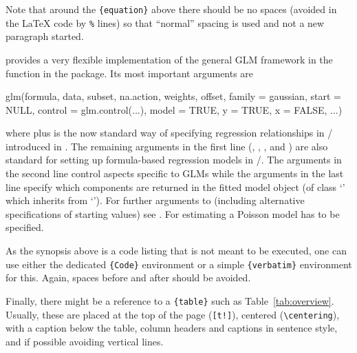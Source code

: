 \documentclass[article]{jss}
\newcommand{\class}[1]{`\code{#1}'}
\newcommand{\fct}[1]{\code{#1()}}
\begin{document}
\begin{leftbar}
Note that around the \verb|{equation}| above there should be no spaces (avoided
in the {\LaTeX} code by \verb|%| lines) so that ``normal'' spacing is used and
not a new paragraph started.
\end{leftbar}

 provides a very flexible implementation of the general GLM
framework in the function \fct{glm} \citep{Chambers+Hastie:1992} in the
 package. Its most important arguments are
\begin{Code}
glm(formula, data, subset, na.action, weights, offset,
  family = gaussian, start = NULL, control = glm.control(...),
  model = TRUE, y = TRUE, x = FALSE, ...)
\end{Code}
where  plus  is the now standard way of specifying
regression relationships in / introduced in
\cite{Chambers+Hastie:1992}. The remaining arguments in the first line
(, , , and ) are also
standard  for setting up formula-based regression models in
/. The arguments in the second line control aspects
specific to GLMs while the arguments in the last line specify which components
are returned in the fitted model object (of class \class{glm} which inherits
from \class{lm}). For further arguments to \fct{glm} (including alternative
specifications of starting values) see . For estimating a Poisson
model  has to be specified.

\begin{leftbar}
As the synopsis above is a code listing that is not meant to be executed,
one can use either the dedicated \verb|{Code}| environment or a simple
\verb|{verbatim}| environment for this. Again, spaces before and after should be
avoided.

Finally, there might be a reference to a \verb|{table}| such as
Table~\ref{tab:overview}. Usually, these are placed at the top of the page
(\verb|[t!]|), centered (\verb|\centering|), with a caption below the table,
column headers and captions in sentence style, and if possible avoiding vertical
lines.
\end{leftbar}
\end{document}
